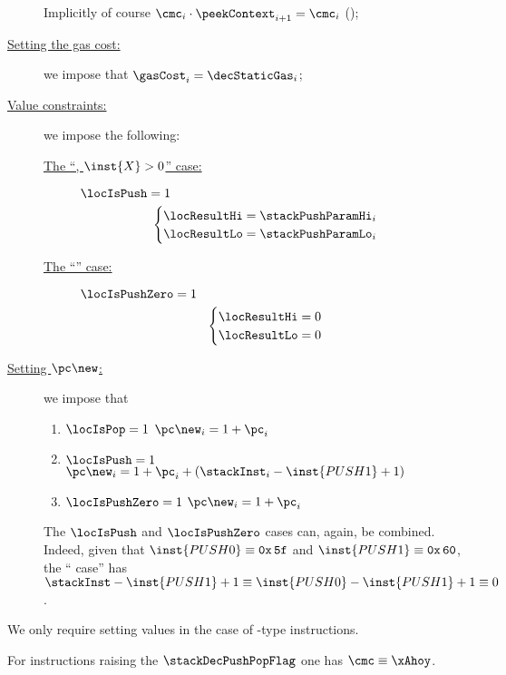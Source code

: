 \begin{description}
		\saNote{}
		Implicitly of course $\cmc_{i} \cdot \peekContext_{i + 1} = \cmc_{i}$ (\trash);
	\item[\underline{Setting the gas cost:}]
		we impose that $\gasCost_{i} = \decStaticGas_{i}$;
	\item[\underline{Value constraints:}]
		we impose the following:
		\begin{description}
			\item[\underline{The ``, $\inst{X} > 0$'' case:}] 
				\label{hub: instruction handling: push pop: setting result to push value for PUSHX}
				\If $\locIsPush = 1$ \Then
				\[
					\begin{cases}
						\locResultHi = \stackPushParamHi_{i} \\
						\locResultLo = \stackPushParamLo_{i} \\
					\end{cases}
				\]
			\item[\underline{The ``'' case:}] 
				\label{hub: instruction handling: push pop: setting result to zero for PUSH0}
				\If $\locIsPushZero = 1$ \Then
				\[
					\begin{cases}
						\locResultHi = 0 \\
						\locResultLo = 0 \\
					\end{cases}
				\]
		\end{description}
	\item[\underline{Setting $\pc\new$:}]
		we impose that
		\begin{enumerate}
			\item \If $\locIsPop      = 1$ \Then $\pc\new_{i} = 1 + \pc_{i}$
			\item \If $\locIsPush     = 1$ \Then $\pc\new_{i} = 1 + \pc_{i} + (\stackInst_{i} - \inst{PUSH1} + 1)$
			\item \If $\locIsPushZero = 1$ \Then $\pc\new_{i} = 1 + \pc_{i}$
		\end{enumerate}
		\saNote{}
		The $\locIsPush$ and $\locIsPushZero$ cases
		can, again, be combined.
		Indeed, given that
		$\inst{PUSH0} \equiv \texttt{0x\,5f}$ and
		$\inst{PUSH1} \equiv \texttt{0x\,60}$,
		the `` case'' has
		$\stackInst - \inst{PUSH1} + 1 \equiv \inst{PUSH0} - \inst{PUSH1} + 1 \equiv 0$.
\end{description}
\saNote{}
We only require setting values in the case of -type instructions.

\saNote{}
For instructions raising the $\stackDecPushPopFlag$ one has $\cmc \equiv \xAhoy$.
